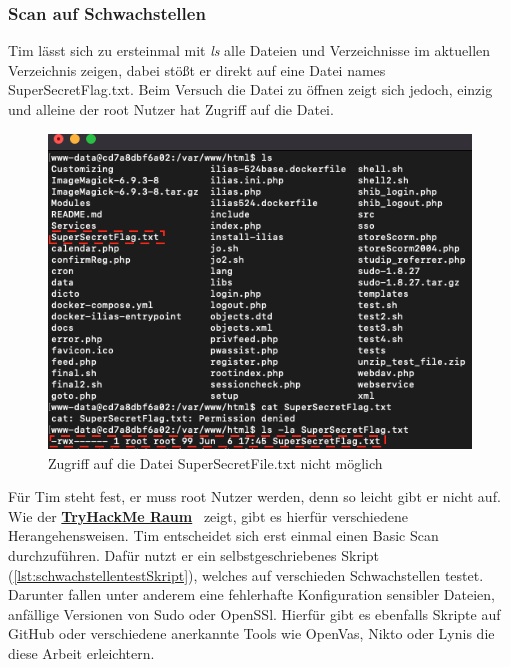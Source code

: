 \documentclass[10pt, a4paper,onecolumn ,titlepage]{article}
\begin{document}
    \subsubsection{Scan auf Schwachstellen}
    \label{subsubsec:scanSchwachstellen}
    Tim lässt sich zu ersteinmal mit \textit{ls} alle Dateien und Verzeichnisse im aktuellen Verzeichnis zeigen, dabei stößt er direkt auf eine Datei names SuperSecretFlag.txt.
    Beim Versuch die Datei zu öffnen zeigt sich jedoch, einzig und alleine der root Nutzer hat Zugriff auf die Datei.

    \begin{figure}[H]
        \centering
        \includegraphics[width=1\textwidth]{storyline_bilder_vm2/FileDenied}
        \caption{Zugriff auf die Datei SuperSecretFile.txt nicht möglich}
        \label{fig:fileDenied}
    \end{figure}
    \noindent
    Für Tim steht fest, er muss root Nutzer werden, denn so leicht gibt er nicht auf.
    Wie der \href{https://tryhackme.com/room/linprivesc}{\textbf{TryHackMe Raum}}~\parencite{privilegeEscalationRaumTryHackMe} zeigt, gibt es hierfür verschiedene Herangehensweisen.
    Tim entscheidet sich erst einmal einen Basic Scan durchzuführen.
    Dafür nutzt er ein selbstgeschriebenes Skript (\ref{lst:schwachstellentestSkript}), welches auf verschieden Schwachstellen testet.
    Darunter fallen unter anderem eine fehlerhafte Konfiguration sensibler Dateien, anfällige Versionen von Sudo oder OpenSSl.
    Hierfür gibt es ebenfalls Skripte auf GitHub oder verschiedene anerkannte Tools wie OpenVas, Nikto oder Lynis die diese Arbeit erleichtern.
    \\
\end{document}
